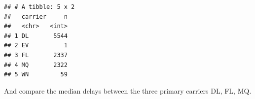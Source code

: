 \documentclass[]{book}
\newenvironment{Shaded}{\begin{snugshade}}{\end{snugshade}}
\newcommand{\KeywordTok}[1]{\textcolor[rgb]{0.13,0.29,0.53}{\textbf{#1}}}
\newcommand{\NormalTok}[1]{#1}
\newcommand{\OperatorTok}[1]{\textcolor[rgb]{0.81,0.36,0.00}{\textbf{#1}}}
\newcommand{\StringTok}[1]{\textcolor[rgb]{0.31,0.60,0.02}{#1}}
\theoremstyle{definition}
\theoremstyle{definition}
\theoremstyle{definition}
\theoremstyle{remark}
\begin{document}
\begin{Shaded}
\end{Shaded}

\begin{verbatim}
## # A tibble: 5 x 2
##   carrier     n
##   <chr>   <int>
## 1 DL       5544
## 2 EV          1
## 3 FL       2337
## 4 MQ       2322
## 5 WN         59
\end{verbatim}

And compare the median delays between the three primary carriers DL, FL,
MQ.
\end{document}

